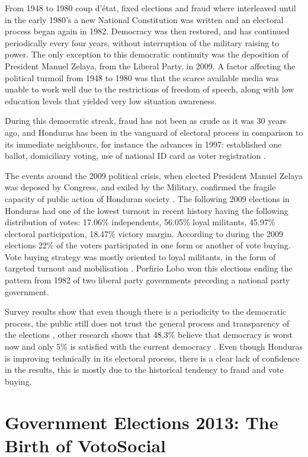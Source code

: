 \documentclass[letterpaper,10pt]{article}
\begin{document}
From 1948 to 1980 coup d'\'{e}tat, fixed elections and fraud where interleaved until in the early 1980's a new National Constitution was written and an electoral process began again in 1982. Democracy was then restored, and has continued periodically every four years, without interruption of the military raising to power. The only exception to this democratic continuity was the deposition of President Manuel Zelaya, from the Liberal Party, in 2009. A factor affecting the political turmoil from 1948 to 1980 was that the scarce available media was unable to work well due to the restrictions of freedom of speech, along with low education levels that yielded very low situation awareness.

During this democratic streak, fraud has not been as crude as it was 30 years ago, and Honduras has been in the vanguard of electoral process in comparison to its immediate neighbours, for instance the advances in 1997: established one ballot, domiciliary voting, use of national ID card as voter registration \citep{romero2014}.

The events around the 2009 political crisis, when elected President Manuel Zelaya was deposed by Congress, and exiled by the Military, confirmed the fragile capacity of public action of Honduran society \citep{romero2014}. The following 2009 elections in Honduras had one of the lowest turnout in recent history having the following distribution of votes: 17.06\% independents, 56.05\% loyal militants, 45.97\% electoral participation, 18.47\% victory margin. According to \cite{gonza2014} during the 2009 elections 22\% of the voters participated in one form or another of vote buying. Vote buying strategy was mostly oriented to loyal militants, in the form of targeted turnout and mobilisation \citep{gonza2014}. Porfirio Lobo won this elections ending the pattern from 1982 of two liberal party governments preceding a national party government.

Survey results show that even though there is a periodicity to the democratic process, the public still does not trust the general process and transparency of the elections \citep{romero2014}, other research shows that 48.3\% believe that democracy is worst now and only 5\% is satisfied with the current democracy \citep{latinbar}. Even though Honduras is improving technically in its electoral process, there is a clear lack of confidence in the results, this is mostly due to the historical tendency to fraud and vote buying.

\section{Government Elections 2013: The Birth of VotoSocial}
\end{document}
